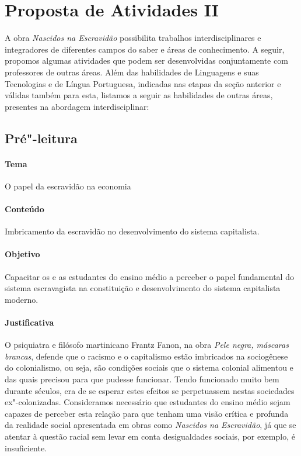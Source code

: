 \documentclass[11pt]{extarticle}
\begin{document}


\section{Proposta de Atividades II}

A obra \emph{Nascidos na Escravidão} possibilita trabalhos
interdisciplinares e integradores de diferentes campos do saber e áreas
de conhecimento. A seguir, propomos algumas atividades que podem ser
desenvolvidas conjuntamente com professores de outras áreas. Além das
habilidades de Linguagens e suas Tecnologias e de Língua Portuguesa,
indicadas nas etapas da seção anterior e válidas também para esta,
listamos a seguir as habilidades de outras áreas, presentes na abordagem
interdisciplinar:

\subsection{Pré"-leitura}

\paragraph{Tema} O papel da escravidão na economia

\paragraph{Conteúdo} Imbricamento da escravidão no desenvolvimento do sistema capitalista.

\paragraph{Objetivo} Capacitar os e as estudantes do ensino médio a perceber o papel fundamental
do sistema escravagista na constituição e desenvolvimento do sistema capitalista moderno.

\paragraph{Justificativa} O psiquiatra e filósofo martinicano Frantz Fanon, na obra \emph{Pele negra,
máscaras brancas}, defende que o racismo e o capitalismo estão imbricados na sociogênese 
do colonialismo, ou seja, são condições sociais que o sistema colonial alimentou e das 
quais precisou para que pudesse funcionar. Tendo funcionado muito bem durante séculos, 
era de se esperar estes efeitos se perpetuassem nestas sociedades ex"-colonizadas. 
Consideramos necessário que estudantes do ensino médio sejam capazes de perceber 
esta relação para que tenham uma visão crítica e profunda da realidade social
apresentada em obras como \emph{Nascidos na Escravidão}, já que se atentar à questão
racial sem levar em conta desigualdades sociais, por exemplo, é insuficiente. 
\end{document}
